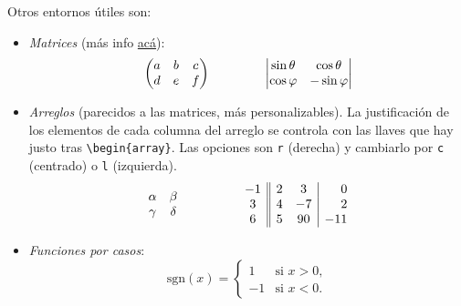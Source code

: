 \documentclass[12pt, spanish]{report}
\theoremstyle{definition} %
\theoremstyle{remark} %
\theoremstyle{plain} %
\theoremstyle{plain} %
\theoremstyle{plain} %
\theoremstyle{plain} %
\theoremstyle{plain} %
\theoremstyle{remark} %
\numberwithin{defn}{chapter}
\newcommand{\sgn}[0]{\mathrm{sgn}} %
\begin{document}
Otros entornos útiles son:
\begin{itemize}
    \item \textit{Matrices} (más info \href{www.overleaf.com/learn/latex/Matrices}{acá}):
    \[
        \begin{pmatrix}
        a & b & c\\
        d & e & f
        \end{pmatrix}\hspace{1.5cm}
        \begin{vmatrix}
        \sin\theta & \cos\theta\\
        \cos\varphi & -\sin\varphi
        \end{vmatrix}
    \]
    \item \textit{Arreglos} (parecidos a las matrices, más personalizables). La justificación de los elementos de cada columna del arreglo se controla con las llaves que hay justo tras \verb|\begin{array}|. Las opciones son \verb|r| (derecha) y cambiarlo por \verb|c| (centrado) o \verb|l| (izquierda).
    \[
      \begin{array}{cc}
        \alpha & \beta \\
         \gamma & \delta
      \end{array}\hspace{1.5cm}
      \begin{array}{c||cc|r}
        -1 & 2 &  3 &   0 \\
         3 & 4 & -7 &   2\\
         6 & 5 & 90 & -11
      \end{array}
    \]
    \item \textit{Funciones por casos}:
    \[
        \sgn(x) = \begin{cases}
            1& \text{si $x > 0$},\\
            -1& \text{si $x < 0$}.
        \end{cases}
    \]
\end{itemize}
\end{document}
